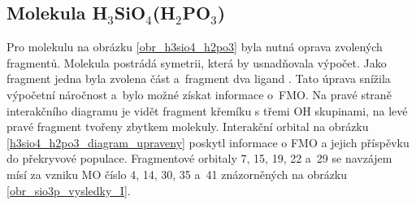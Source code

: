 \documentclass[
  printed, %
  table,   %
  lof,     %
  lot,     %
  oneside,
]{fithesis3}
\begin{document}
 \subsection{Molekula H$_3$SiO$_4$(H$_2$PO$_3$)}
 Pro molekulu  na obrázku \ref{obr_h3sio4_h2po3} byla nutná oprava zvolených fragmentů. Molekula postrádá symetrii, která by usnadňovala výpočet. Jako fragment jedna byla zvolena část  a~fragment dva ligand . Tato úprava snížila výpočetní náročnost a~bylo možné získat informace o~FMO. Na pravé straně interakčního diagramu je vidět fragment křemíku s třemi OH skupinami, na levé pravé fragment tvořeny zbytkem molekuly. Interakční orbital na obrázku \ref{h3sio4_h2po3_diagram_upraveny} poskytl informace o FMO a jejich příspěvku do překryvové populace. Fragmentové orbitaly  7, 15, 19, 22 a~29 se navzájem mísí za vzniku MO číslo 4, 14, 30, 35 a~41 znázorněných na obrázku \ref{obr_sio3p_vysledky_I}.   

\begin{figure}
\begin{center}

\label{obr_SiOH3OH2PO)_vysledky_I}
\end{center}
\end{figure}
\end{document}
